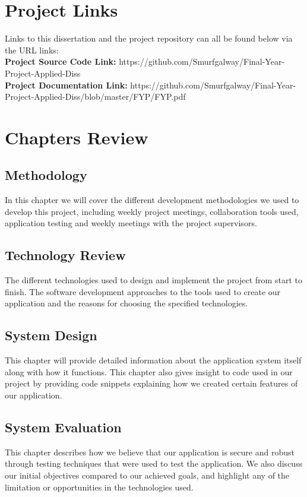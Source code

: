 \section{Project Links}
Links to this dissertation and the project repository can all be found below via the URL links:
\\
\textbf{Project Source Code Link: } https://github.com/Smurfgalway/Final-Year-Project-Applied-Diss \\
\textbf{Project Documentation Link: } https://github.com/Smurfgalway/Final-Year-Project-Applied-Diss/blob/master/FYP/FYP.pdf\\


\section{Chapters Review}

\subsection{Methodology}
In this chapter we will cover the different development methodologies we used to develop this project, including weekly project meetings, collaboration tools used, application testing and weekly meetings with the project supervisors.

\subsection{Technology Review}
The different technologies used to design and implement the project from start to finish. The software development approaches to the tools used to create our application and the reasons for choosing the specified technologies.

\subsection{System Design}
This chapter will provide detailed information about the application system itself along with how it functions. This chapter also gives insight to code used in our project by providing code snippets explaining how we created certain features of our application.

\subsection{System Evaluation}
This chapter describes how we believe that our application is secure and robust through testing techniques that were used to test the application. We also discuss our initial objectives compared to our achieved goals, and highlight any of the limitation or opportunities in the technologies used.

